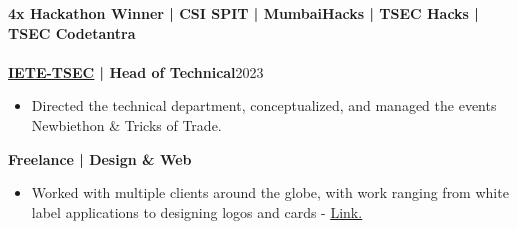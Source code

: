 \documentclass[a4paper,11pt]{article}
\newcommand{\entry}[2]{
  \noindent\textbf{#1}\hfill{#2}\\[-1em]
}
\newcommand{\contactlink}[2]{
    \href{#1}{\color{cyan}\underline{#2}}
}
\newenvironment{itemizeWithPadding}{
  \begin{itemize}
}{
  \end{itemize}
  \vspace{0.5em} %
}
\begin{document}
\entry{4x Hackathon Winner | CSI SPIT | MumbaiHacks | TSEC Hacks | TSEC Codetantra}{}\\
\entry{\contactlink{https://ietetsec.in/}{IETE-TSEC} | Head of Technical}{2023}
\begin{itemizeWithPadding}
    \item Directed the technical department, conceptualized, and managed the events Newbiethon \& Tricks of Trade.
\end{itemizeWithPadding}

\entry{Freelance | Design \& Web}{}
\begin{itemizeWithPadding}
  \item Worked with multiple clients around the globe, with work ranging from white label applications to designing logos and cards - \contactlink{https://rms-frontend-inky.vercel.app/}{Link.}
\end{itemizeWithPadding}
\end{document}
